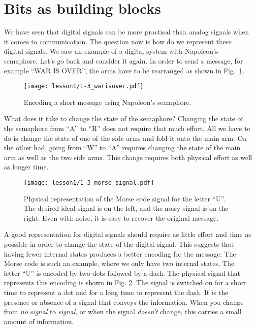 \section{Bits as building blocks}


We have seen that digital signals can be more practical than analog signals when it comes to communication.
The question now is how do we represent these digital signals.
We saw an example of a digital system with Napoleon's semaphore.
Let's go back and consider it again.
In order to send a message, for example ``WAR IS OVER'', the arms have to be rearranged as shown in Fig.~\ref{fig:1-3_warisover}.

\begin{figure}[t]
    \centering
    \texttt{[image: lesson1/1-3\_warisover.pdf]}
    \caption[Message with Napoleon's semaphore]{Encoding a short message using Napoleon's semaphore.}
    \label{fig:1-3_warisover}
\end{figure}

What does it take to change the state of the semaphore?
Changing the state of the semaphore from ``A'' to ``R'' does not require that much effort.
All we have to do is change the state of one of the side arms and fold it onto the main arm.
On the other had, going from ``W'' to ``A'' requires changing the state of the main arm as well as the two side arms.
This change requires both physical effort as well as longer time.

\begin{figure}[t]
    \centering
    \texttt{[image: lesson1/1-3\_morse\_signal.pdf]}
    \caption[Morse code signal]{Physical representation of the Morse code signal for the letter ``U''. The desired ideal signal is on the left, and the noisy signal is on the right. Even with noise, it is easy to recover the original message.}
    \label{fig:1-3_morse_signal}
\end{figure}

A good representation for digital signals should require as little effort and time as possible in order to change the state of the digital signal.
This suggests that having fewer internal states produces a better encoding for the message.
The Morse code is such an example, where we only have two internal states.
The letter ``U'' is encoded by two dots followed by a dash.
The physical signal that represents this encoding is shown in Fig. \ref{fig:1-3_morse_signal}.
The signal is switched on for a short time to represent a dot and for a long time to represent the dash.
It is the presence or absence of a signal that conveys the information.
When you change from \emph{no signal} to \emph{signal}, or when the signal \emph{doesn't} change, this carries a small amount of information.

